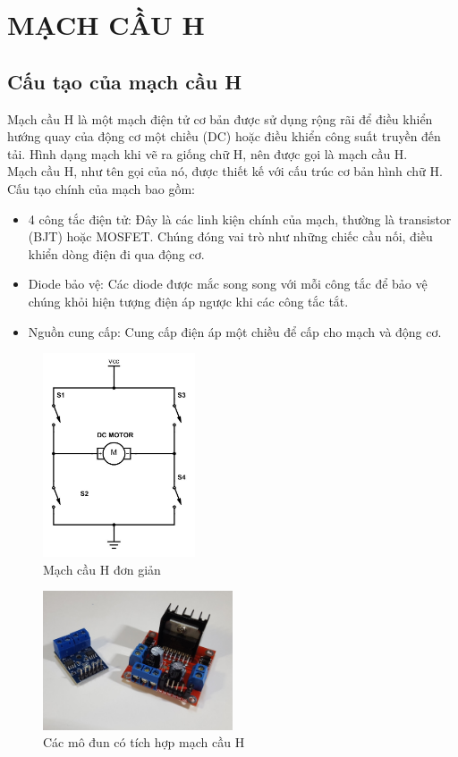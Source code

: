 \chapter{MẠCH CẦU H}
    \section{Cấu tạo của mạch cầu H}
        Mạch cầu H là một mạch điện tử cơ bản được sử dụng rộng rãi để điều khiển hướng quay của động cơ một chiều (DC) hoặc điều khiển công suất truyền đến tải. Hình dạng mạch khi vẽ ra giống chữ H, nên được gọi là mạch cầu H.\\
        Mạch cầu H, như tên gọi của nó, được thiết kế với cấu trúc cơ bản hình chữ H. Cấu tạo chính của mạch bao gồm: 
        \vspace{-0.4cm}
        \begin{itemize}
            \item 4 công tắc điện tử: Đây là các linh kiện chính của mạch, thường là transistor (BJT) hoặc MOSFET. Chúng đóng vai trò như những chiếc cầu nối, điều khiển dòng điện đi qua động cơ.
            \item Diode bảo vệ: Các diode được mắc song song với mỗi công tắc để bảo vệ chúng khỏi hiện tượng điện áp ngược khi các công tắc tắt.
            \item Nguồn cung cấp: Cung cấp điện áp một chiều để cấp cho mạch và động cơ.
        \end{itemize}
        \begin{figure}[H]
            \centering
            \includegraphics[width=0.4\textwidth]{pictures/cauhsimple.png}
            \caption{Mạch cầu H đơn giản}
            \label{fig:hbridge}
        \end{figure}
        \begin{figure}[H]
            \centering
            \includegraphics[width=0.5\textwidth]{pictures/cauhcurcuit.png}
            \caption{Các mô đun có tích hợp mạch cầu H}
            \label{fig:hbridge}
        \end{figure}
        \cleardoublepage

